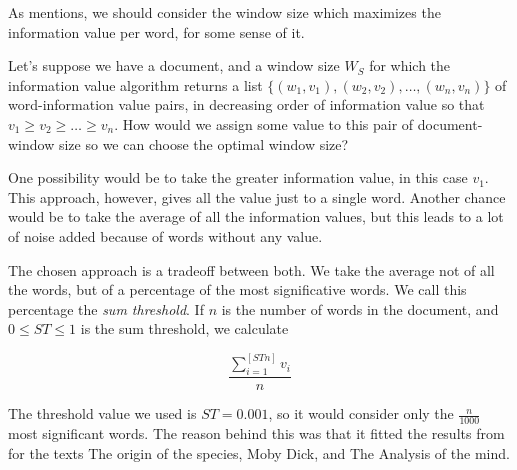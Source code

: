 \documentclass{pnastwo}
\begin{document}
\begin{article}

As \cite{DARWIN} mentions, we should consider the window size which maximizes the information value per word, for some sense of it.

Let's suppose we have a document, and a window size $W_S$ for which the information value algorithm returns a list $\{(w_1, v_1), (w_2, v_2), \dots ,(w_n, v_n) \}$ of word-information value pairs, in decreasing order of information value so that $v_1 \geq v_2 \geq \dots \geq v_n$. How would we assign some value to this pair of document-window size so we can choose the optimal window size?

One possibility would be to take the greater information value, in this case $v_1$. This approach, however, gives all the value just to a single word. Another chance would be to take the average of all the information values, but this leads to a lot of noise added because of words without any value.


The chosen approach is a tradeoff between both. We take the average not of all the words, but of a percentage of the most significative words. We call this percentage the \emph{sum threshold}. If $n$ is the number of words in the document, and $0 \leq ST \leq 1$ is the sum threshold, we calculate

\begin{equation}
  \frac{\sum_{i=1}^{[ST n]}v_i}{n} 
\end{equation}


The threshold value we used is $ST=0.001$, so it would consider only the $\frac{n}{1000}$ most significant words. The reason behind this was that it fitted the results from \cite{DARWIN} for the texts The origin of the species, Moby Dick, and  The Analysis of the mind.



\end{article}
\end{document}
